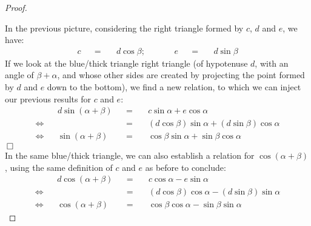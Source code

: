 \documentclass[solutions.tex]{subfiles}
\begin{document}
\begin{proof}
\begin{figure}[H]
\end{figure}
In the previous picture, considering the right triangle formed by $c$, $d$
and $e$, we have:
\begin{equation*} \begin{aligned}
	c &&=\quad& d\cos\beta; &&\quad& e &&=\quad& d\sin\beta
\end{aligned} \end{equation*}
If we look at the blue/thick triangle right triangle (of hypotenuse
$d$, with an angle of $\beta+\alpha$, and whose other sides are
created by projecting the point formed by $d$ and $e$ down to the
bottom), we find a new relation, to which we can inject our previous
results for $c$ and $e$:
\begin{equation*} \begin{aligned}
	~ && d\sin(\alpha+\beta) &&=\quad& c\sin\alpha+e\cos\alpha \\
	\Leftrightarrow && ~ &&=\quad& (d\cos\beta)\sin\alpha+(d\sin\beta)\cos\alpha \\
	\Leftrightarrow && \sin(\alpha+\beta) &&=\quad& \boxed{\cos\beta\sin\alpha+\sin\beta\cos\alpha}
\end{aligned} \end{equation*}\hfill$\qed$\\
In the same blue/thick triangle, we can also establish a relation
for $\cos(\alpha+\beta)$, using the same definition of $c$ and $e$
as before to conclude:
\begin{equation*} \begin{aligned}
	~ && d\cos(\alpha+\beta) &&=\quad& c\cos\alpha-e\sin\alpha \\
	\Leftrightarrow && ~ &&=\quad& (d\cos\beta)\cos\alpha-(d\sin\beta)\sin\alpha \\
	\Leftrightarrow && \cos(\alpha+\beta) &&=\quad& \boxed{\cos\beta\cos\alpha-\sin\beta\sin\alpha}
\end{aligned} \end{equation*}

\end{proof}
\end{document}
